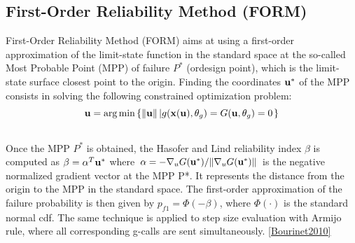 \documentclass[letterpaper,10pt,english]{sphinxmanual}
\begin{document}
\subsection{First-Order Reliability Method (FORM)}
\label{theory:first-order-reliability-method-form}
First-Order Reliability Method (FORM) aims at using a first-order
approximation of the limit-state function in the standard space at the
so-called Most Probable Point (MPP) of failure $P^*$ (ordesign point),
which is the limit-state surface closest point to the origin. Finding the
coordinates ${\bf u}^*$ of the MPP consists in solving the following
constrained optimization problem:
\begin{gather}
\begin{split}{\bf u} = \arg\min\left\{\|{\bf u}\| \left|g({\bf x}({\bf u}),{\bf \theta}_g) = G({\bf u},{\bf \theta}_g) = 0 \right. \right\}\end{split}\notag\\\begin{split}\end{split}\notag
\end{gather}
Once the MPP $P^*$ is obtained, the Hasofer and Lind reliability index
$\beta$ is computed as $\beta = {\bf \alpha}^T {\bf u}^*$
where ${\bf \alpha} = -\nabla_u G({\bf u}^*) / \| \nabla_u G({\bf u}^*)\|$
is the negative normalized gradient vector at the MPP P*. It represents the
distance from the origin to the MPP in the standard space. The first-order
approximation of the failure probability is then given by $p_{f1} =
\Phi(-\beta)$, where $\Phi(\cdot)$ is the standard normal cdf. The same
technique is applied to step size evaluation with Armijo rule, where all
corresponding g-calls are sent simultaneously. {\hyperref[references:bourinet2010]{{[}Bourinet2010{]}}}
\begin{figure}[htbp]
\centering

\label{theory:form}\end{figure}
\end{document}
